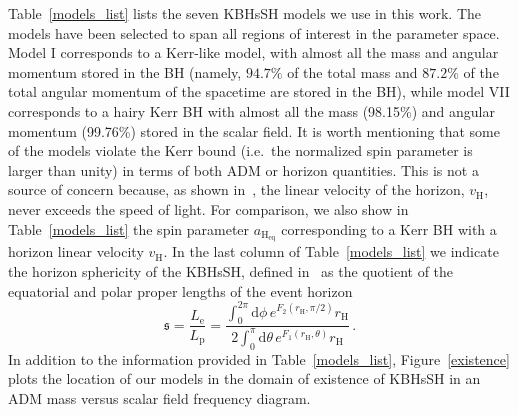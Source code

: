 \documentclass[twocolumn,aps,showpacs,showkeys,prd,superscriptaddress,byrevtex, amsmath]{revtex4-1}
\begin{document}
Table~\ref{models_list} lists the seven KBHsSH models we use in this work. The models have been selected to span all regions of interest in the parameter space. Model I corresponds to a Kerr-like model, with almost all the mass and angular momentum stored in the BH (namely, $94.7\%$ of the total mass and $87.2\%$ of the total angular momentum of the spacetime are stored in the BH), while model VII corresponds to a hairy Kerr BH with almost all the mass (98.15\%) and angular momentum (99.76\%) stored in the scalar field. It is worth mentioning that some of the models violate the Kerr bound (i.e.~the normalized spin parameter is larger than unity) in terms of both ADM or horizon quantities. This is not a source of concern because, as shown in~\cite{Herdeiro:2015c}, the linear velocity of the horizon, $v_{\mathrm{H}}$, never exceeds the speed of light. For comparison, we also show in Table~\ref{models_list} the spin parameter $a_{\mathrm{H_{eq}}}$ corresponding to a Kerr BH with a horizon linear velocity $v_{\mathrm{H}}$. In the last column of Table~\ref{models_list} we indicate the horizon sphericity of the KBHsSH, defined in~\cite{Delgado:2018} as the quotient of the equatorial and polar proper lengths of the event horizon
\begin{equation}
\mathfrak{s} = \frac{L_{\mathrm{e}}}{L_{\mathrm{p}}} = \frac{\int^{2\pi}_{0} \mathrm{d}\phi \, e^{F_2(r_{\mathrm{H}}, \pi/2)} r_{\mathrm{H}}}{2\int^{\pi}_{0} \mathrm{d} \theta \, e^{F_1(r_{\mathrm{H}}, \theta)} r_{\mathrm{H}}}\,.
\end{equation}
In addition to the information provided in Table~\ref{models_list}, Figure~\ref{existence} plots the location of our models in the domain of existence of KBHsSH in an ADM mass versus scalar field frequency diagram. 
\end{document}
